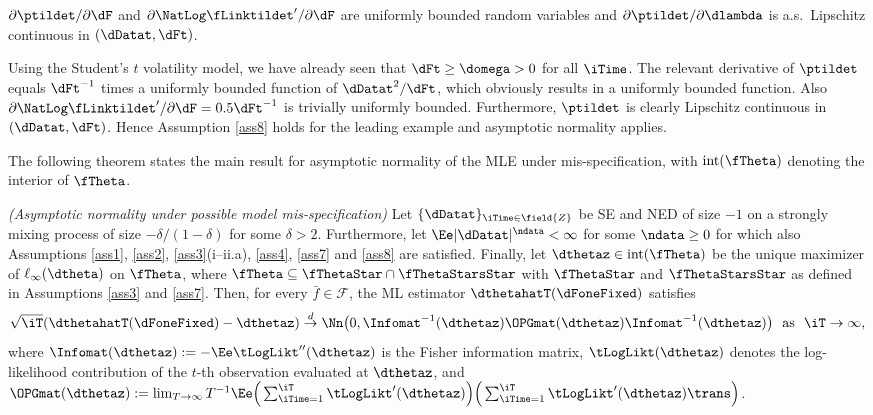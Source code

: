 \begin{ass}
\label{ass8}
$\partial \ptildet / \partial \dF$  
and $\partial \NatLog \fLinktildet' / \partial \dF$ 
are uniformly bounded random variables 
and $\partial \ptildet / \partial \dlambda$ is a.s.~Lipschitz continuous 
in $(\dDatat,\dFt)$. 
\end{ass}

\begin{exmc} %
Using the Student's $t$ volatility model, we have already seen that $\dFt\geq\domega>0$ for all $\iTime$. 
The relevant derivative of $\ptildet$ equals $\dFt^{-1}$ times a uniformly bounded function of $\dDatat^2/\dFt$, which obviously results in a uniformly bounded function. Also $\partial \NatLog \fLinktildet' / \partial \dF = 0.5\dFt^{-1}$ is trivially uniformly bounded.
Furthermore, $\ptildet$ is clearly Lipschitz continuous in $(\dDatat,\dFt)$. Hence Assumption \ref{ass8} holds for the leading example and asymptotic normality applies.
\end{exmc}


The following theorem states the main result for asymptotic normality of the MLE under mis-specification, with $\mathrm{int}(\fTheta)$ denoting the interior of $\fTheta$. 

\begin{theo} \label{theo4}
\emph{(Asymptotic normality under possible model mis-specification)}
Let $\{\dDatat\}_{\iTime \in \field{Z}}$ be SE and  NED of size $-1$ on a strongly mixing process of size $-\delta/(1-\delta)$ for some $\delta>2$. Furthermore, let $\Ee|\dDatat|^{\ndata}<\infty$ for some $\ndata\geq 0$ for which also 
Assumptions \ref{ass1}, \ref{ass2}, \ref{ass3}(i--ii.a), \ref{ass4}, \ref{ass7} and \ref{ass8} are satisfied. Finally, let $\dthetaz \in \mathrm{int}(\fTheta)$ be
the unique maximizer of $\ell_{\infty}(\dtheta)$ on $\fTheta$,
where $\fTheta \subseteq \fThetaStar \cap\fThetaStarsStar $  with $\fThetaStar$ and $\fThetaStarsStar$ as defined in Assumptions \ref{ass3} and \ref{ass7}. Then, for every $\bar{f} \in \mathcal{F}$,  the ML estimator $\dthetahatT(\dFoneFixed)$ satisfies 
\begin{equation*}
    \sqrt{\iT}(\dthetahatT(\dFoneFixed) - \dthetaz) \stackrel{d}{\to} 
    \Nn \big(0,\Infomat^{-1}(\dthetaz)\OPGmat(\dthetaz)\Infomat^{-1}(\dthetaz)\big) 
\ \text{ as } \ \iT \to \infty,
\end{equation*}
where $\Infomat(\dthetaz):=-\Ee\tLogLikt''(\dthetaz)$ is the Fisher information matrix,
$\tLogLikt(\dthetaz)$ denotes the log-likelihood contribution of the $t$-th observation evaluated at $\dthetaz$,
and $\OPGmat(\dthetaz) := \lim_{T \to \infty} T^{-1} \Ee \Big( \sum_{\iTime=1}^{\iT}\tLogLikt'(\dthetaz) \Big) \Big( \sum_{\iTime=1}^{\iT} \tLogLikt'(\dthetaz)\trans \Big)$.
\end{theo}

